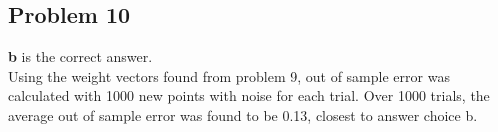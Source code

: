 \documentclass[12 pt]{article}
\begin{document}
	
	\subsection*{Problem 10}
	\textbf{b} is the correct answer. \\
	Using the weight vectors found from problem 9, out of sample error was calculated with 1000 new points with noise for each trial. Over 1000 trials, the average out of sample error was found to be 0.13, closest to answer choice b.


	
	
\end{document}

